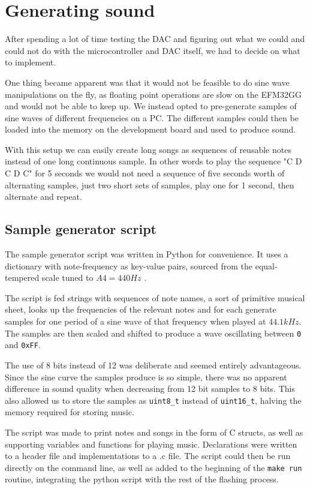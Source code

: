 \section{Generating sound}
After spending a lot of time testing the DAC and figuring out what we could and could not do with the microcontroller and DAC itself, we had to decide on what to implement.

One thing became apparent was that it would not be feasible to do sine wave manipulations on the fly, as floating point operations are slow on the EFM32GG and would not be able to keep up. We instead opted to pre-generate samples of sine waves of different frequencies on a PC. The different samples could then be loaded into the memory on the development board and used to produce sound.

With this setup we can easily create long songs as sequences of reusable notes instead of one long continuous sample. In other words to play the sequence "C D C D C" for 5 seconds we would not need a sequence of five seconds worth of alternating samples, just two short sets of samples, play one for 1 second, then alternate and repeat.

\subsection{Sample generator script}
The sample generator script was written in Python for convenience. It uses a dictionary with note-frequency as key-value pairs, sourced from the equal-tempered scale tuned to $A4 = 440Hz$ \cite{notefreqs}.

The script is fed strings with sequences of note names, a sort of primitive musical sheet, looks up the frequencies of the relevant notes and for each generate samples for one period of a sine wave of that frequency when played at $44.1kHz$. The samples are then scaled and shifted to produce a wave oscillating between \texttt{0} and \texttt{0xFF}.

The use of 8 bits instead of 12 was deliberate and seemed entirely advantageous. Since the sine curve the samples produce is so simple, there was no apparent difference in sound quality when decreasing from 12 bit samples to 8 bits. This also allowed us to store the samples as \texttt{uint8\_t} instead of \texttt{uint16\_t}, halving the memory required for storing music.

The script was made to print notes and songs in the form of C structs, as well as supporting variables and functions for playing music. Declarations were written to a header file and implementations to a .c file. The script could then be run directly on the command line, as well as added to the beginning of the \texttt{make run} routine, integrating the python script with the rest of the flashing process.
